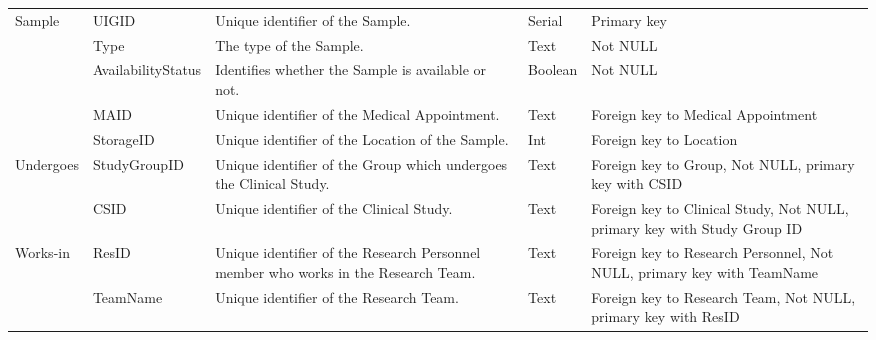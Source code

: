 \begin{longtable}{|p{}|p{} |p{}|p{}|p{} |}
\multirow{3}{*}{Sample} 
&UIGID 
    &Unique identifier of the Sample.
    &Serial
    &Primary key
\\\cline{2-5}
&Type
    &The type of the Sample.
    &Text
    &Not NULL
\\\cline{2-5}
&AvailabilityStatus 
    &Identifies whether the Sample is available or not.
    &Boolean
    &Not NULL
\\\cline{2-5}
&MAID 
    &Unique identifier of the Medical Appointment. 
    &Text
    &Foreign key to Medical Appointment
\\\cline{2-5}
&StorageID 
    &Unique identifier of the Location of the Sample.
    &Int
    &Foreign key to Location
\\\hline

\multirow{2}{*}{Undergoes}
	& StudyGroupID
		& Unique identifier of the Group which undergoes the Clinical Study.
		& Text
		& Foreign key to Group, Not NULL, primary key with CSID
\\\cline{2-5}
	& CSID 
		& Unique identifier of the Clinical Study. 
		& Text
		& Foreign key to Clinical Study, Not NULL, primary key with Study Group ID
\\\hline

\multirow{2}{*}{Works-in}
	& ResID 
		& Unique identifier of the Research Personnel member who works in the Research Team. 
		& Text
		& Foreign key to Research Personnel, Not NULL, primary key with TeamName
\\\cline{2-5}
	& TeamName 
		& Unique identifier of the Research Team. 
		& Text
		& Foreign key to Research Team, Not NULL, primary key with ResID
\\\hline

\end{longtable}